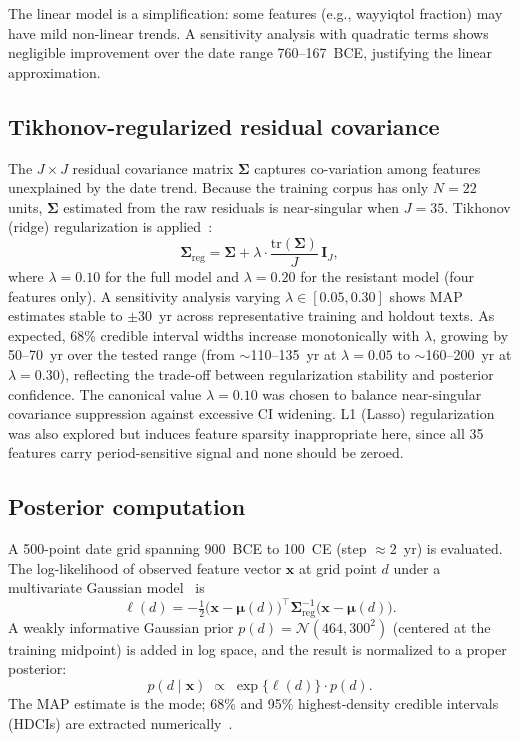 \documentclass[10pt,letterpaper]{article}
\newcommand{\Smat}{\boldsymbol{\Sigma}}
\newcommand{\muvec}{\boldsymbol{\mu}}
\newcommand{\xvec}{\mathbf{x}}
\begin{document}
The linear model is a simplification: some features (e.g., wayyiqtol
fraction) may have mild non-linear trends.  A sensitivity analysis with
quadratic terms shows negligible improvement over the date range
760--167~BCE, justifying the linear approximation.

\subsection*{Tikhonov-regularized residual covariance}

The $J \times J$ residual covariance matrix $\Smat$ captures co-variation
among features unexplained by the date trend.  Because the training
corpus has only $N = 22$ units, $\Smat$ estimated from the raw residuals
is near-singular when $J = 35$.  Tikhonov (ridge) regularization is
applied~\cite{Hoerl1970}:
%
\begin{equation}
  \Smat_{\text{reg}} = \Smat +
    \lambda \cdot \frac{\mathrm{tr}(\Smat)}{J} \, \mathbf{I}_J,
  \label{eq:ridge}
\end{equation}
%
where $\lambda = 0.10$ for the full model and $\lambda = 0.20$ for the
resistant model (four features only).  A sensitivity analysis varying
$\lambda \in [0.05, 0.30]$ shows MAP estimates stable to $\pm 30$~yr
across representative training and holdout texts.  As expected, 68\%
credible interval widths increase monotonically with $\lambda$, growing
by 50--70~yr over the tested range (from $\sim$110--135~yr at
$\lambda = 0.05$ to $\sim$160--200~yr at $\lambda = 0.30$), reflecting
the trade-off between regularization stability and posterior confidence.
The canonical value $\lambda = 0.10$ was chosen to balance near-singular
covariance suppression against excessive CI widening.  L1 (Lasso)
regularization~\cite{Tibshirani1996} was also explored but induces feature sparsity
inappropriate here, since all 35 features carry period-sensitive signal and
none should be zeroed.

\subsection*{Posterior computation}

A 500-point date grid spanning 900~BCE to 100~CE (step $\approx 2$~yr)
is evaluated.  The log-likelihood of observed feature vector $\xvec$
at grid point $d$ under a multivariate Gaussian model~\cite{Bishop2006} is
%
\begin{equation}
  \ell(d) = -\tfrac{1}{2}
    \bigl(\xvec - \muvec(d)\bigr)^{\!\top}
    \Smat_{\text{reg}}^{-1}
    \bigl(\xvec - \muvec(d)\bigr).
  \label{eq:loglik}
\end{equation}
%
A weakly informative Gaussian prior $p(d) = \mathcal{N}(464, 300^2)$
(centered at the training midpoint) is added in log space, and the result
is normalized to a proper posterior:
%
\begin{equation}
  p(d \mid \xvec) \;\propto\; \exp\bigl\{\ell(d)\bigr\} \cdot p(d).
  \label{eq:posterior}
\end{equation}
%
The MAP estimate is the mode; 68\% and 95\% highest-density credible
intervals (HDCIs) are extracted numerically~\cite{Gelman2014}.
\end{document}
